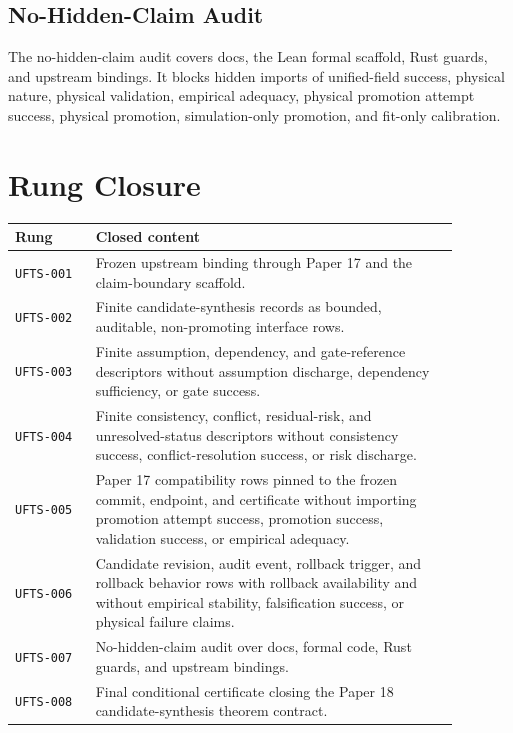 \documentclass{article}
\begin{document}
\subsection{No-Hidden-Claim Audit}

The no-hidden-claim audit covers docs, the Lean formal scaffold, Rust guards,
and upstream bindings.  It blocks hidden imports of unified-field success,
physical nature, physical validation, empirical adequacy, physical promotion
attempt success, physical promotion, simulation-only promotion, and fit-only
calibration.

\section{Rung Closure}

\begin{longtable}{>{\raggedright\arraybackslash}p{0.16\linewidth} >{\raggedright\arraybackslash}p{0.72\linewidth}}
\textbf{Rung} & \textbf{Closed content} \\
\hline
\texttt{UFTS-001} & Frozen upstream binding through Paper 17 and the claim-boundary scaffold. \\
\texttt{UFTS-002} & Finite candidate-synthesis records as bounded, auditable, non-promoting interface rows. \\
\texttt{UFTS-003} & Finite assumption, dependency, and gate-reference descriptors without assumption discharge, dependency sufficiency, or gate success. \\
\texttt{UFTS-004} & Finite consistency, conflict, residual-risk, and unresolved-status descriptors without consistency success, conflict-resolution success, or risk discharge. \\
\texttt{UFTS-005} & Paper 17 compatibility rows pinned to the frozen commit, endpoint, and certificate without importing promotion attempt success, promotion success, validation success, or empirical adequacy. \\
\texttt{UFTS-006} & Candidate revision, audit event, rollback trigger, and rollback behavior rows with rollback availability and without empirical stability, falsification success, or physical failure claims. \\
\texttt{UFTS-007} & No-hidden-claim audit over docs, formal code, Rust guards, and upstream bindings. \\
\texttt{UFTS-008} & Final conditional certificate closing the Paper 18 candidate-synthesis theorem contract. \\
\end{longtable}
\end{document}
